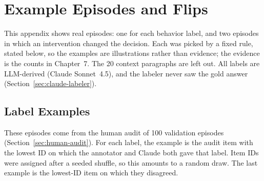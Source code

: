 \chapter{Example Episodes and Flips}
\label{app:examples}

This appendix shows real episodes: one for each behavior label, and two
episodes in which an intervention changed the decision. Each was picked by a
fixed rule, stated below, so the examples are illustrations rather than
evidence; the evidence is the counts in Chapter~7. The 20 context paragraphs
are left out. All labels are LLM-derived (Claude Sonnet~4.5), and the labeler
never saw the gold answer (Section~\ref{sec:claude-labeler}).

\section{Label Examples}

These episodes come from the human audit of 100 validation episodes
(Section~\ref{sec:human-audit}). For each label, the example is the audit item
with the lowest ID on which the annotator and Claude both gave that label.
Item IDs were assigned after a seeded shuffle, so this amounts to a random
draw. The last example is the lowest-ID item on which they disagreed.

